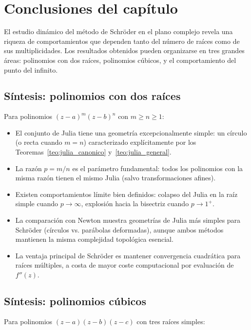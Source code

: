\section{Conclusiones del capítulo}

El estudio dinámico del método de Schröder en el plano complejo revela una riqueza de comportamientos que dependen tanto del número de raíces como de sus multiplicidades. Los resultados obtenidos pueden organizarse en tres grandes áreas: polinomios con dos raíces, polinomios cúbicos, y el comportamiento del punto del infinito.

\subsection{Síntesis: polinomios con dos raíces}

Para polinomios $(z-a)^m(z-b)^n$ con $m\ge n\ge 1$:

\begin{itemize}
\item El conjunto de Julia tiene una geometría excepcionalmente simple: un círculo (o recta cuando $m=n$) caracterizado explícitamente por los Teoremas~\ref{teo:julia_canonico} y~\ref{teo:julia_general}.

\item La razón $p=m/n$ es el parámetro fundamental: todos los polinomios con la misma razón tienen el mismo Julia (salvo transformaciones afines).

\item Existen comportamientos límite bien definidos: colapso del Julia en la raíz simple cuando $p\to\infty$, explosión hacia la bisectriz cuando $p\to 1^+$.

\item La comparación con Newton muestra geometrías de Julia más simples para Schröder (círculos vs. parábolas deformadas), aunque ambos métodos mantienen la misma complejidad topológica esencial.

\item La ventaja principal de Schröder es mantener convergencia cuadrática para raíces múltiples, a costa de mayor coste computacional por evaluación de $f''(z)$.
\end{itemize}

\subsection{Síntesis: polinomios cúbicos}

Para polinomios $(z-a)(z-b)(z-c)$ con tres raíces simples:

